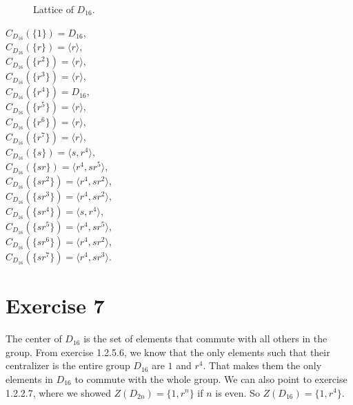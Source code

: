 \documentclass{article}
\begin{document}
\begin{enumerate}[label=\textbf{\alph*.}]
\begin{figure}[H]
        
                \caption{\label{fig:figure1} Lattice of $D_{16}$.}
            \end{figure} 
                
            $C_{D_{16}}(\{1\}) = D_{16}$, \\
            $C_{D_{16}}(\{r\}) = \langle r \rangle$, \\
            $C_{D_{16}}(\{r^2\}) = \langle r \rangle$, \\
            $C_{D_{16}}(\{r^3\}) = \langle r \rangle$, \\
            $C_{D_{16}}(\{r^4\}) = D_{16}$, \\
            $C_{D_{16}}(\{r^5\}) = \langle r \rangle$, \\
            $C_{D_{16}}(\{r^6\}) = \langle r \rangle$, \\
            $C_{D_{16}}(\{r^7\}) = \langle r \rangle$, \\
            $C_{D_{16}}(\{s\}) = \langle s, r^4 \rangle$, \\
            $C_{D_{16}}(\{sr\}) = \langle r^4, sr^5 \rangle$, \\
            $C_{D_{16}}(\{sr^2\}) = \langle r^4, sr^2 \rangle$, \\
            $C_{D_{16}}(\{sr^3\}) = \langle r^4, sr^2 \rangle$, \\
            $C_{D_{16}}(\{sr^4\}) = \langle s, r^4 \rangle$, \\
            $C_{D_{16}}(\{sr^5\}) = \langle r^4, sr^5 \rangle$, \\
            $C_{D_{16}}(\{sr^6\}) = \langle r^4, sr^2 \rangle$, \\
            $C_{D_{16}}(\{sr^7\}) = \langle r^4, sr^3 \rangle$.  
    \end{enumerate}


    \section*{Exercise 7}
    The center of $D_{16}$ is the set of elements 
    that commute with all others in the group.
    From exercise 1.2.5.6, we know that the only elements
    such that their centralizer is the entire group $D_{16}$
    are $1$ and $r^4$.
    That makes them the only elements in $D_{16}$ to commute
    with the whole group.
    We can also point to exercise 1.2.2.7,
    where we showed $Z(D_{2n}) = \{1, r^n\}$ if $n$ is even.
    So $Z(D_{16}) = \{1, r^4\}$.
\end{document}
